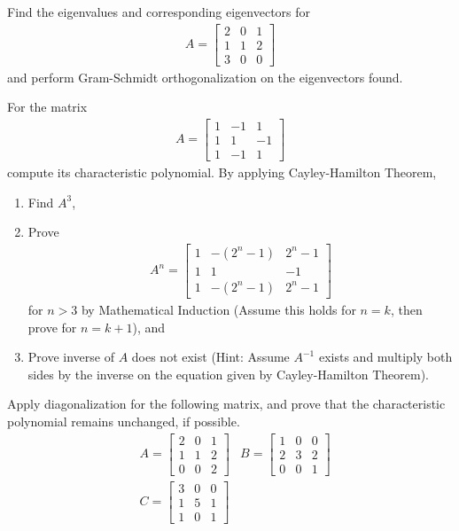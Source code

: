 \begin{Exercise}
Find the eigenvalues and corresponding eigenvectors for
\begin{align*}
A =
\begin{bmatrix}
2 & 0 & 1\\
1 & 1 & 2\\
3 & 0 & 0
\end{bmatrix}
\end{align*}
and perform Gram-Schmidt orthogonalization on the eigenvectors found.
\end{Exercise}

\begin{Exercise}
For the matrix 
\begin{align*}
A = 
\begin{bmatrix}
1 & -1 & 1\\
1 & 1 & -1\\
1 & -1 & 1
\end{bmatrix}
\end{align*}
compute its characteristic polynomial. By applying Cayley-Hamilton Theorem,
\begin{enumerate}[label=(\alph*)]
\item Find $A^{3}$,
\item Prove 
\begin{align*}
A^{n} = \begin{bmatrix}
1 & -(2^n-1) & 2^n-1\\
1 & 1 & -1\\
1 & -(2^n-1) & 2^n-1
\end{bmatrix}
\end{align*}
for $n > 3$ by Mathematical Induction (Assume this holds for $n = k$, then prove for $n = k+1$), and
\item Prove inverse of $A$ does not exist (Hint: Assume $A^{-1}$ exists and multiply both sides by the inverse on the equation given by Cayley-Hamilton Theorem).
\end{enumerate}
\end{Exercise}

\begin{Exercise}
Apply diagonalization for the following matrix, and prove that the characteristic polynomial remains unchanged, if possible.
\begin{align*}
&A =
\begin{bmatrix}
2 & 0 & 1\\
1 & 1 & 2\\
0 & 0 & 2
\end{bmatrix} 
&B =
\begin{bmatrix}
1 & 0 & 0\\
2 & 3 & 2\\
0 & 0 & 1
\end{bmatrix} \\
&C = 
\begin{bmatrix}
3 & 0 & 0\\
1 & 5 & 1\\
1 & 0 & 1
\end{bmatrix} 
\end{align*}
\end{Exercise}

